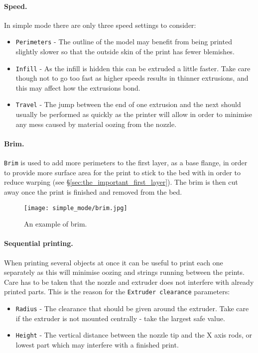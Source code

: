 \paragraph{Speed.} %
\label{par:simple_speed}
In simple mode there are only three speed settings to consider:
\begin{itemize}
	\item \texttt{Perimeters}  - The outline of the model may benefit from being printed slightly slower so that the outside skin of the print has fewer blemishes.
	\item \texttt{Infill}  - As the infill is hidden this can be extruded a little faster.  Take care though not to go too fast as higher speeds results in thinner extrusions, and this may affect how the extrusions bond.
	\item \texttt{Travel}  - The jump between the end of one extrusion and the next should usually be performed as quickly as the printer will allow in order to minimise any mess caused by material oozing from the nozzle.
\end{itemize}

\paragraph{Brim.} %
\label{par:simple_brim}
\texttt{Brim} is used to add more perimeters to the first layer, as a base flange, in order to provide more surface area for the print to stick to the bed with in order to reduce warping (see §\ref{sec:the_important_first_layer}). The brim is then cut away once the print is finished and removed from the bed.

\begin{figure}[H]
\centering
\texttt{[image: simple\_mode/brim.jpg]}
\caption{An example of brim.}
\label{fig:an_example_of_brim}
\end{figure}



\paragraph{Sequential printing.} %
\label{par:simple_sequential_printing}
When printing several objects at once it can be useful to print each one separately as this will minimise oozing and strings running between the prints.  Care has to be taken that the nozzle and extruder does not interfere with already printed parts.  This is the reason for the \texttt{Extruder clearance} parameters: 
\begin{itemize}
	\item \texttt{Radius}  - The clearance that should be given around the extruder.  Take care if the extruder is not mounted centrally - take the largest safe value.
	\item \texttt{Height}  - The vertical distance between the nozzle tip and the X axis rods, or lowest part which may interfere with a finished print.
\end{itemize}

